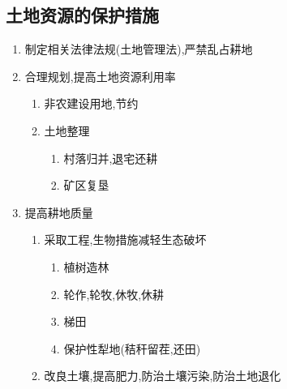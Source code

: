 \documentclass[a4paper]{article}
\begin{document}
    \subsection{土地资源的保护措施}
    \begin{enumerate}
        \item 制定相关法律法规(土地管理法),严禁乱占耕地
        \item 合理规划,提高土地资源利用率
        \begin{enumerate}
            \item 非农建设用地,节约
            \item 土地整理
            \begin{enumerate}
                \item 村落归并,退宅还耕
                \item 矿区复垦
            \end{enumerate}
        \end{enumerate}
        \item 提高耕地质量
        \begin{enumerate}
            \item 采取工程,生物措施减轻生态破坏
            \begin{enumerate}
                \item 植树造林
                \item 轮作,轮牧,休牧,休耕
                \item 梯田
                \item 保护性犁地(秸秆留茬,还田)
            \end{enumerate}
            \item 改良土壤,提高肥力,防治土壤污染,防治土地退化
        \end{enumerate}
    \end{enumerate}
\end{document}

